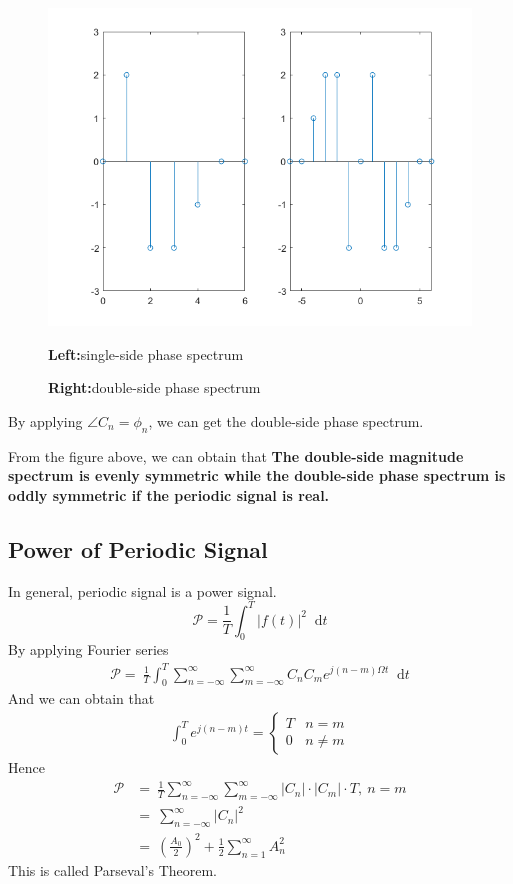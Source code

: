 \documentclass[margin,line]{res}
\newcommand*{\dif}{\mathop{}\!\mathrm{d}}
\begin{document}
\begin{resume}
\begin{itemize}
\begin{figure}[H]
		\centerline{\includegraphics[width=0.9\linewidth]{figure/fig_11.png}}
		\centerline{\textbf{Left:}single-side phase spectrum}
		\centerline{\textbf{Right:}double-side phase spectrum}
	\end{figure}
	By applying $\angle C_n=\phi_n$, we can get the double-side phase spectrum.
\end{itemize}
From the figure above, we can obtain that \textbf{The double-side magnitude spectrum is evenly symmetric while the double-side phase spectrum is oddly symmetric if the periodic signal is real.} 
\subsection{\textbf{Power of Periodic Signal}}
In general, periodic signal is a power signal.
$$
\mathscr{P}=\frac{1}{T} \int_{0}^{T}\left|f(t)\right|^2 \dif t
$$
By applying Fourier series
\begin{align}
\mathscr{P} = \ \frac{1}{T} \int_{0}^{T} {\sum\limits_{n=-\infty}^{\infty} \sum\limits_{m=-\infty}^{\infty} {C_n C_m e^{j(n-m)\Omega t}}} \dif t \nonumber
\end{align}
And we can obtain that
\begin{align}
	\int_{0}^{T} e^{j(n-m)t}=
	\begin{cases}
		T & n=m \\
		0 & n\neq m
	\end{cases} \nonumber
\end{align}
Hence
\begin{align}
	\mathscr{P} 
	&= \ \frac{1}{T} \sum\limits_{n=-\infty}^{\infty} \sum\limits_{m=-\infty}^{\infty} \left|C_n\right| \cdot \left|C_m\right| \cdot T, \ n=m \nonumber \\
	&= \ \sum\limits_{n=-\infty}^{\infty}{\left|C_n\right|^2} \nonumber \\
	&= \ \left(\frac{A_0}{2}\right)^2 + \frac{1}{2}\sum\limits_{n=1}^{\infty}A_n^2 \nonumber
\end{align}
This is called Parseval's Theorem.

\end{resume}
\end{document}
